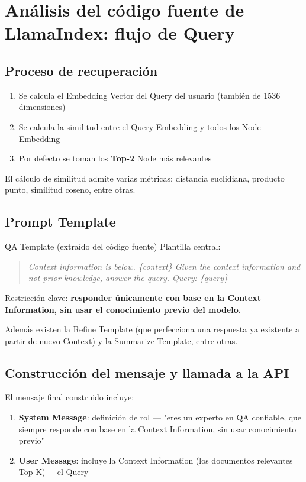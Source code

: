 \section{Análisis del código fuente de LlamaIndex: flujo de Query}

\subsection{Proceso de recuperación}

\begin{enumerate}
    \item Se calcula el Embedding Vector del Query del usuario (también de 1536 dimensiones)
    \item Se calcula la similitud entre el Query Embedding y todos los Node Embedding
    \item Por defecto se toman los \textbf{Top-2} Node más relevantes
\end{enumerate}

El cálculo de similitud admite varias métricas: distancia euclidiana, producto punto, similitud coseno, entre otras.

\subsection{Prompt Template}

\begin{importantbox}{QA Template (extraído del código fuente)}
Plantilla central:
\begin{quote}
\textit{Context information is below. \{context\} Given the context information and not prior knowledge, answer the query. Query: \{query\}}
\end{quote}
Restricción clave: \textbf{responder únicamente con base en la Context Information, sin usar el conocimiento previo del modelo.}
\end{importantbox}

Además existen la Refine Template (que perfecciona una respuesta ya existente a partir de nuevo Context) y la Summarize Template, entre otras.

\subsection{Construcción del mensaje y llamada a la API}

El mensaje final construido incluye:
\begin{enumerate}
    \item \textbf{System Message}: definición de rol — "eres un experto en QA confiable, que siempre responde con base en la Context Information, sin usar conocimiento previo"
    \item \textbf{User Message}: incluye la Context Information (los documentos relevantes Top-K) + el Query
\end{enumerate}

